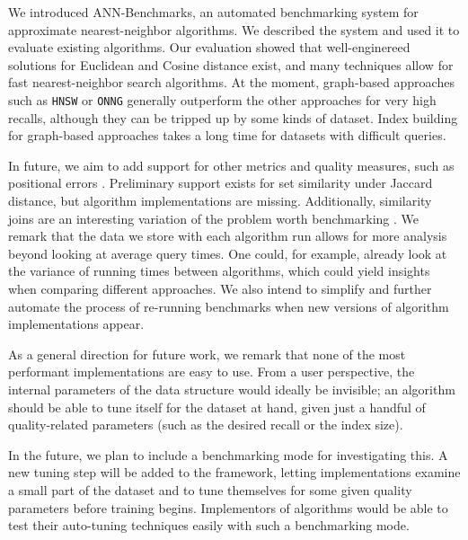 We introduced \textsf{ANN-Benchmarks}, an automated benchmarking system for
approximate nearest-neighbor algorithms. We described the system and used it
to evaluate existing algorithms. Our evaluation showed that well-enginereed
solutions for Euclidean and Cosine distance exist, and many techniques allow
for fast nearest-neighbor search algorithms. At the moment, graph-based
approaches such as \texttt{HNSW} or \texttt{ONNG} generally outperform the
other approaches for very high recalls,
although they can be tripped up by some kinds of dataset.
Index building for graph-based approaches takes a long time for
datasets with difficult queries.

In future, we aim to add support for other metrics and quality measures, such
as positional errors \cite{ZezulaSAR98}. Preliminary support
exists for set similarity under Jaccard distance, but algorithm implementations
are missing. Additionally, similarity joins 
are an interesting variation of the problem worth benchmarking \cite{ChristianiPS18}. We remark that the data we store with each algorithm run allows for more analysis beyond looking at average query times. One could, for example, already look at the variance of running times between algorithms, which could yield insights when comparing different approaches.
We also intend
to simplify and further automate the process of re-running benchmarks
when new versions of algorithm implementations appear. 

As a general direction for future work, we remark that none of the most performant implementations are easy to use. From a user perspective, the internal parameters of the data structure would ideally be invisible; an algorithm should be able to tune itself for the dataset at hand, given just a handful of quality-related parameters (such as the desired recall or the index size).

In the future, we plan to include a benchmarking mode for investigating this.
A new tuning step will be added to the framework, letting implementations
examine a small part of the dataset and to tune themselves for some given
quality parameters before training begins.
Implementors of algorithms would be able to test their auto-tuning techniques
easily with such a benchmarking mode.

